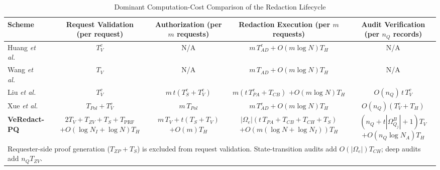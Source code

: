 \documentclass[lettersize,journal]{IEEEtran}
\begin{document}
\begin{table}[t]
\centering
\caption{Dominant Computation-Cost Comparison of the Redaction Lifecycle}
\label{tab:comp-cost}
\footnotesize
\renewcommand{\arraystretch}{1.25}
\setlength{\tabcolsep}{4pt}
\begin{tabular}{lcccc}
\toprule
\textbf{Scheme} &
\makecell{\textbf{Request Validation}\\\textbf{(per request)}} &
\makecell{\textbf{Authorization}\\\textbf{(per $m$ requests)}} &
\makecell{\textbf{Redaction Execution}\\\textbf{(per $m$ requests)}} &
\makecell{\textbf{Audit Verification}\\\textbf{(per $n_Q$ records)}} \\
\midrule

Huang \emph{et al.}~\cite{ref14}
& $T_V^{c}$
& N/A
& $m\,T_{AD}^{c}+O(m\log N)T_H$
& N/A \\

Wang \emph{et al.}~\cite{ref17}
& $T_V$
& N/A
& $m\,T_{AD}+O(m\log N)T_H$
& N/A \\

Liu \emph{et al.}~\cite{ref27}
& $T_V^{c}$
& $m\,t(T_S^{c}+T_V^{c})$
& \makecell{$m(t\,T_{PA}^{c}+T_{CB})$\\$+O(m\log N)T_H$}
& $O(n_Q)\,t\,T_V^{c}$ \\

Xue \emph{et al.}~\cite{ref33}
& $T_{Pol}+T_V^{c}$
& $m\,T_{Pol}$
& $m\,T_{AD}^{c}+O(m\log N)T_H$
& $O(n_Q)(T_V^{c}+T_H)$ \\

\midrule
\textbf{VeRedact-PQ}
& \makecell{$2T_V+T_{ZV}+T_S+T_{\mathrm{PRF}}$\\$+O(\log N_I+\log N)T_H$}
& \makecell{$m\,T_V+t(T_S+T_V)$\\$+O(m)T_H$}
& \makecell{$|\Omega_e|(t\,T_{PA}+T_{CB}+T_{CH}+T_S)$\\$+O(m(\log N+\log N_I))T_H$}
& \makecell{$(n_Q+t|\Omega_{Q_j}^B|+1)T_V$\\$+O(n_Q\log N_A)T_H$} \\
\bottomrule
\multicolumn{5}{l}{\footnotesize Requester-side proof generation ($T_{ZP}+T_S$) is excluded from request validation.
State-transition audits add $O(|\Omega_e|)T_{CH}$; deep audits add $n_Q T_{ZV}$.}
\end{tabular}
\end{table}
\end{document}
